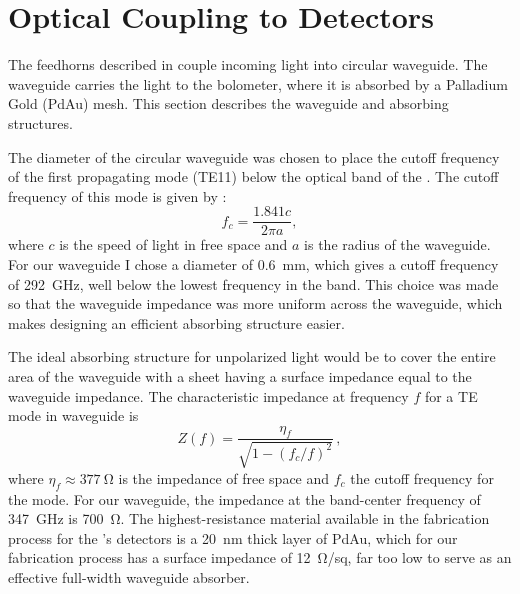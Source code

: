 \section{Optical Coupling to Detectors} \label{sec:ch4-coupling}

The feedhorns described in  couple incoming light into circular waveguide.
The waveguide carries the light to the bolometer, where it is absorbed by a Palladium Gold (PdAu) mesh.
This section describes the waveguide and absorbing structures.

The diameter of the circular waveguide was chosen to place the cutoff frequency of the first propagating mode (TE11) below the optical band of the \Imager.
The cutoff frequency of this mode is given by \cite[Chapter~5]{harrington_time-harmonic_2001}:
\begin{equation} \label{eqn:ch4-te11-cutoff}
  f_c = \frac{1.841 c}{2 \pi a },
\end{equation}
where $c$ is the speed of light in free space and $a$ is the radius of the waveguide.
For our waveguide I chose a diameter of \SI{0.6}{\mm}, which gives a cutoff frequency of \SI{292}{\GHz}, well below the lowest frequency in the band.
This choice was made so that the waveguide impedance was more uniform across the waveguide, which makes designing an efficient absorbing structure easier.

The ideal absorbing structure for unpolarized light would be to cover the entire area of the waveguide with a sheet having a surface impedance equal to the waveguide impedance.
The characteristic impedance at frequency $f$ for a TE mode in waveguide is \cite[Chapter~2]{harrington_time-harmonic_2001}
\begin{equation} \label{eqn:ch4-wg-imp}
  Z (f) = \frac{\eta_f}{\sqrt{1 - (f_c/f)^2}}\,,
\end{equation}
where $\eta_f \approx \SI{377}{\ohm}$ is the impedance of free space and $f_c$ the cutoff frequency for the mode.
For our waveguide, the impedance at the band-center frequency of \SI{347}{\GHz} is \SI{700}{\ohm}.
The highest-resistance material available in the fabrication process for the \Imager's detectors is a \SI{20}{\nm} thick layer of PdAu, which for our fabrication process has a surface impedance of \SI{12}{\ohm}/sq, far too low to serve as an effective full-width waveguide absorber.

